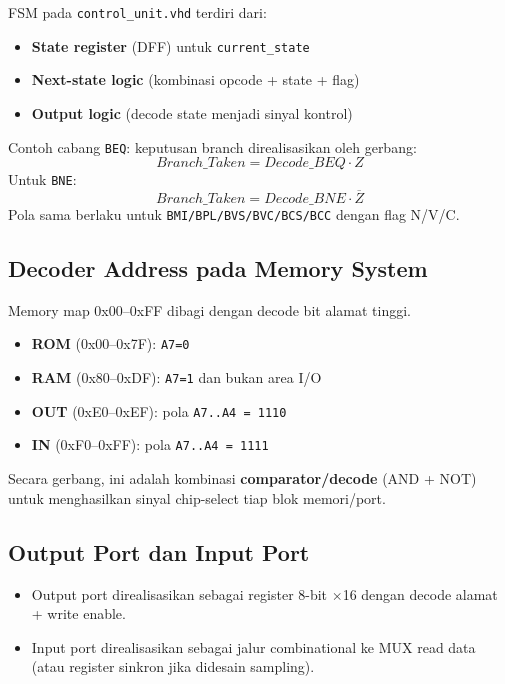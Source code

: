 \documentclass[12pt,a4paper]{report}
\begin{document}
FSM pada \texttt{control\_unit.vhd} terdiri dari:
\begin{itemize}
  \item \textbf{State register} (DFF) untuk \texttt{current\_state}
  \item \textbf{Next-state logic} (kombinasi opcode + state + flag)
  \item \textbf{Output logic} (decode state menjadi sinyal kontrol)
\end{itemize}

Contoh cabang \texttt{BEQ}: keputusan branch direalisasikan oleh gerbang:
\[
Branch\_Taken = Decode\_BEQ \cdot Z
\]
Untuk \texttt{BNE}:
\[
Branch\_Taken = Decode\_BNE \cdot \overline{Z}
\]
Pola sama berlaku untuk \texttt{BMI/BPL/BVS/BVC/BCS/BCC} dengan flag N/V/C.

\subsection{Decoder Address pada Memory System}

Memory map 0x00--0xFF dibagi dengan decode bit alamat tinggi.

\begin{itemize}
  \item \textbf{ROM} (0x00--0x7F): \texttt{A7=0}
  \item \textbf{RAM} (0x80--0xDF): \texttt{A7=1} dan bukan area I/O
  \item \textbf{OUT} (0xE0--0xEF): pola \texttt{A7..A4 = 1110}
  \item \textbf{IN} (0xF0--0xFF): pola \texttt{A7..A4 = 1111}
\end{itemize}

Secara gerbang, ini adalah kombinasi \textbf{comparator/decode} (AND + NOT) untuk menghasilkan sinyal chip-select tiap blok memori/port.

\subsection{Output Port dan Input Port}

\begin{itemize}
  \item Output port direalisasikan sebagai register 8-bit \(\times\)16 dengan decode alamat + write enable.
  \item Input port direalisasikan sebagai jalur combinational ke MUX read data (atau register sinkron jika didesain sampling).
\end{itemize}
\end{document}
